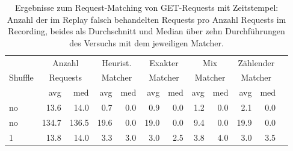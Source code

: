 \documentclass[12pt,a4paper]{report}
\begin{document}
\begin{table}[H]
	\centering
	\caption[Ergebnisse zum Request-Matching von GET-Requests mit Zeitstempel]{
		Ergebnisse zum Request-Matching von GET-Requests mit Zeitstempel:
		Anzahl der im Replay falsch behandelten Requests pro Anzahl Requests im Recording,
		beides als Durchschnitt und Median über zehn Durchführungen des Versuchs mit dem jeweiligen Matcher.
	}
	\label{tab:get_ts}
	\begin{tabular}{|l|r|r|r|r|r|r|r|r|r|r|r|}
		\hline
		\multirow{3}{*}{Shuffle} & \multicolumn{2}{|c|}{Anzahl}   & \multicolumn{2}{|c|}{Heurist.} & \multicolumn{2}{|c|}{Exakter} & \multicolumn{2}{|c|}{Mix}     & \multicolumn{2}{|c|}{Zählender}                                    \\
		                         & \multicolumn{2}{|c|}{Requests} & \multicolumn{2}{|c|}{Matcher}  & \multicolumn{2}{|c|}{Matcher} & \multicolumn{2}{|c|}{Matcher} & \multicolumn{2}{|c|}{Matcher}                                      \\ \cline{2-11}
		                         & avg                            & med                            & avg                           & med                           & avg                             & med  & avg  & med  & avg  & med  \\ \hline
		no                       & 13.6                           & 14.0                           & 0.7                           & 0.0                           & 0.9                             & 0.0  & 1.2  & 0.0  & 2.1  & 0.0  \\ \hline
		no                       & 134.7                          & 136.5                          & 19.6                          & 0.0                           & 19.0                            & 0.0  & 9.4  & 0.0  & 19.9 & 0.0  \\ \hline
		1                        & 13.8                           & 14.0                           & 3.3                           & 3.0                           & 3.0                             & 2.5  & 3.8  & 4.0  & 3.0  & 3.5  \\ \hline

\end{tabular}
\end{table}
\end{document}
